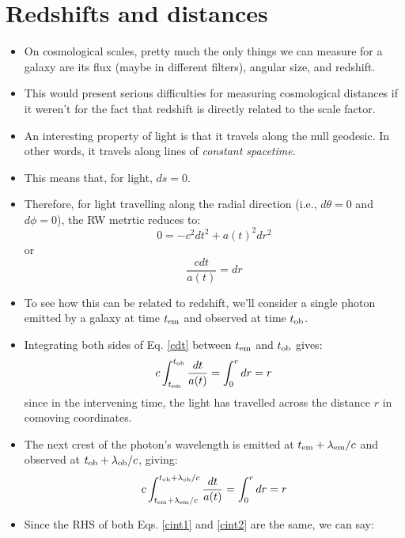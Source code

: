 \documentclass[11pt]{article}
\begin{document}
\section{Redshifts and distances}
\begin{itemize}
\item On cosmological scales, pretty much the only things we can measure for a galaxy are its flux (maybe in different filters), angular size, and redshift.
\item This would present serious difficulties for measuring cosmological distances if it weren't for the fact that redshift is directly related to the scale factor.
\item An interesting property of light is that it travels along the null geodesic. In other words, it travels along lines of {\it constant spacetime}.
\item This means that, for light, $ds = 0$.
\item Therefore, for light travelling along the radial direction (i.e., $d\theta=0$ and $d\phi=0$), the RW metrtic reduces to:
\begin{equation}
    0 = -c^2dt^2+a(t)^2dr^2
\end{equation}
or
\begin{equation}
    \label{cdt}
    \frac{cdt}{a(t)}=dr
\end{equation}
\item To see how this can be related to redshift, we'll consider a single photon emitted by a galaxy at time $t_{\rm em}$ and observed at time $t_{\rm ob}$.
\item Integrating both sides of Eq. \ref{cdt} between $t_{\rm em}$ and $t_{\rm ob}$ gives:
\begin{equation}
    \label{cint1}
    c\int_{t_{\rm em}}^{t_{\rm ob}}\frac{dt}{a(t)}=\int_0^r dr=r
\end{equation}
since in the intervening time, the light has travelled across the distance $r$ in comoving coordinates.
\item The next crest of the photon's wavelength is emitted at $t_{\rm em}+\lambda_{\rm em}/c$ and observed at $t_{\rm ob}+\lambda_{\rm ob}/c$, giving:
\begin{equation}
    \label{cint2}
    c\int_{t_{\rm em}+\lambda_{\rm em}/c}^{t_{\rm ob}+\lambda_{\rm ob}/c}\frac{dt}{a(t)}=\int_0^r dr=r
\end{equation}
\item Since the RHS of both Eqs. \ref{cint1} and \ref{cint2} are the same, we can say:
\begin{equation}

\end{equation}
\end{itemize}
\end{document}
